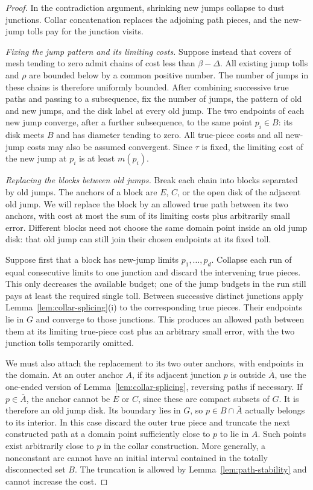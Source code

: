 \begin{proof}
In the contradiction argument, shrinking new jumps collapse to dust
junctions.  Collar concatenation replaces the adjoining path pieces,
and the new-jump tolls pay for the junction visits.

\emph{Fixing the jump pattern and its limiting costs.}
Suppose instead that covers of mesh tending to zero admit chains of
cost less than $\beta-\Delta$.  All existing jump tolls and $\rho$
are bounded below by a common positive number.  The number of jumps
in these chains is therefore uniformly bounded.  After combining
successive true paths and passing to a subsequence, fix the number
of jumps, the pattern of old and new jumps, and the disk label at
every old jump.  The two endpoints of each new jump converge, after
a further subsequence, to the same point $p_i\in B$: its disk meets
$B$ and has diameter tending to zero.  All true-piece costs and all
new-jump costs may also be assumed convergent.  Since $\tau$ is fixed,
the limiting cost of the new jump at $p_i$ is at least $m(p_i)$.

\emph{Replacing the blocks between old jumps.}
Break each chain into blocks separated by old jumps.  The anchors
of a block are $E$, $C$, or the open disk of the adjacent old jump.
We will replace the block by an allowed true path between its two
anchors, with cost at most the sum of its limiting costs plus
arbitrarily small error.  Different blocks need not choose the same
domain point inside an old jump disk: that old jump can still join
their chosen endpoints at its fixed toll.

Suppose first that a block has new-jump limits
$p_1,\ldots,p_d$.  Collapse each run of equal consecutive limits
to one junction and discard the intervening true pieces.  This only
decreases the available budget; one of the jump budgets in the run
still pays at least the required single toll.  Between successive
distinct junctions apply Lemma~\ref{lem:collar-splicing}\textup{(i)}
to the corresponding true pieces.  Their endpoints lie in $G$ and
converge to those junctions.  This produces an allowed path between
them at its limiting true-piece cost plus an arbitrary small error,
with the two junction tolls temporarily omitted.

We must also attach the replacement to its two outer anchors, with
endpoints in the domain.
At an outer anchor $A$, if its adjacent junction $p$ is outside
$\overline A$, use the one-ended version of
Lemma~\ref{lem:collar-splicing}, reversing paths if necessary.  If
$p\in\overline A$, the anchor cannot be $E$ or $C$, since these
are compact subsets of $G$.  It is therefore an old jump disk.
Its boundary lies in $G$, so $p\in B\cap\overline A$ actually
belongs to its interior.  In this case discard the outer true
piece and truncate the next constructed path at a domain point
sufficiently close to $p$ to lie in $A$.  Such points exist
arbitrarily close to $p$ in the collar construction.  More generally,
a nonconstant arc cannot have an initial interval contained in the
totally disconnected set $B$.  The truncation is allowed by
Lemma~\ref{lem:path-stability} and cannot increase the cost.


\end{proof}

